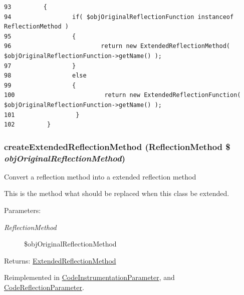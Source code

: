 \begin{Code}\begin{verbatim}93         {
94                 if( $objOriginalReflectionFunction instanceof ReflectionMethod )
95                 {
96                         return new ExtendedReflectionMethod( $objOriginalReflectionFunction->getName() );
97                 }
98                 else
99                 {
100                         return new ExtendedReflectionFunction( $objOriginalReflectionFunction->getName() );
101                 }
102         }
\end{verbatim}
\end{Code}


\hypertarget{class_extended_reflection_parameter_ec7c1d4b204b6e3a6291d3b867afb688}{
\subsubsection[{createExtendedReflectionMethod}]{\setlength{\rightskip}{0pt plus 5cm}createExtendedReflectionMethod (ReflectionMethod \$ {\em objOriginalReflectionMethod})}}
\label{class_extended_reflection_parameter_ec7c1d4b204b6e3a6291d3b867afb688}


Convert a reflection method into a extended reflection method

This is the method what should be replaced when this class be extended.

\begin{Desc}
\item[Parameters:]
\begin{description}
\item[{\em ReflectionMethod}]\$objOriginalReflectionMethod \end{description}
\end{Desc}
\begin{Desc}
\item[Returns:]\hyperlink{class_extended_reflection_method}{ExtendedReflectionMethod} \end{Desc}


Reimplemented in \hyperlink{class_code_instrumentation_parameter_ec7c1d4b204b6e3a6291d3b867afb688}{CodeInstrumentationParameter}, and \hyperlink{class_code_reflection_parameter_ec7c1d4b204b6e3a6291d3b867afb688}{CodeReflectionParameter}.

